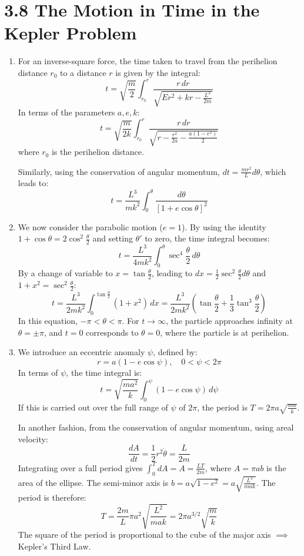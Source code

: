 \documentclass{article}
\begin{document}
	\hrulefill
	
	\section*{3.8 The Motion in Time in the Kepler Problem}
	
	\begin{enumerate}
		\item For an inverse-square force, the time taken to travel from the perihelion distance $r_0$ to a distance $r$ is given by the integral:
		\[
		t = \sqrt{\frac{m}{2}} \int_{r_0}^{r} \frac{r \, dr}{\sqrt{Er^2 + kr - \frac{L^2}{2m}}}
		\]
		In terms of the parameters $a, e, k$:
		\[
		t = \sqrt{\frac{m}{2k}} \int_{r_0}^{r} \frac{r \, dr}{\sqrt{r - \frac{r^2}{2a} - \frac{a(1-e^2)}{2}}}
		\]
		where $r_0$ is the perihelion distance.
		
		Similarly, using the conservation of angular momentum, $dt = \frac{mr^2}{L} d\theta$, which leads to:
		\[
		t = \frac{L^3}{mk^2} \int_0^\theta \frac{d\theta}{[1+e\cos\theta]^2}
		\]
		
		\item We now consider the parabolic motion ($e=1$). By using the identity $1+\cos\theta = 2\cos^2\frac{\theta}{2}$ and setting $\theta'$ to zero, the time integral becomes:
		\[
		t = \frac{L^3}{4mk^2} \int_0^\theta \sec^4\frac{\theta}{2} \, d\theta
		\]
		By a change of variable to $x = \tan\frac{\theta}{2}$, leading to $dx = \frac{1}{2}\sec^2\frac{\theta}{2}d\theta$ and $1+x^2 = \sec^2\frac{\theta}{2}$:
		\[
		t = \frac{L^3}{2mk^2} \int_0^{\tan\frac{\theta}{2}} (1+x^2) \, dx = \frac{L^3}{2mk^2} \left(\tan\frac{\theta}{2} + \frac{1}{3}\tan^3\frac{\theta}{2}\right)
		\]
		In this equation, $-\pi < \theta < \pi$. For $t \to \infty$, the particle approaches infinity at $\theta = \pm\pi$, and $t=0$ corresponds to $\theta=0$, where the particle is at perihelion.
		
		\item We introduce an eccentric anomaly $\psi$, defined by:
		\[
		r = a(1-e\cos\psi), \quad 0 < \psi < 2\pi
		\]
		In terms of $\psi$, the time integral is:
		\[
		t = \sqrt{\frac{ma^2}{k}} \int_0^\psi (1-e\cos\psi) \, d\psi
		\]
		If this is carried out over the full range of $\psi$ of $2\pi$, the period is $T = 2\pi a \sqrt{\frac{ma}{k}}$.
		
		In another fashion, from the conservation of angular momentum, using areal velocity:
		\[
		\frac{dA}{dt} = \frac{1}{2}r^2\dot{\theta} = \frac{L}{2m}
		\]
		Integrating over a full period gives $\int_0^T dA = A = \frac{LT}{2m}$, where $A=\pi ab$ is the area of the ellipse. The semi-minor axis is $b=a\sqrt{1-e^2} = a\sqrt{\frac{L^2}{mak}}$. The period is therefore:
		\[
		T = \frac{2m}{L} \pi a^2 \sqrt{\frac{L^2}{mak}} = 2\pi a^{3/2} \sqrt{\frac{m}{k}}
		\]
		The square of the period is proportional to the cube of the major axis $\implies$ Kepler's Third Law.
		

\end{enumerate}
\end{document}
